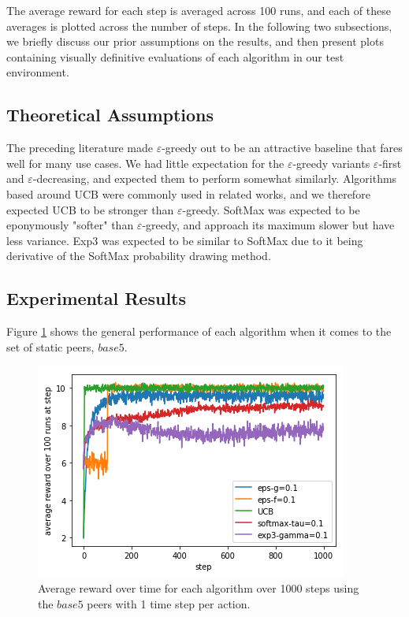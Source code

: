 \documentclass{article}
\begin{document}
The average reward for each step is averaged across 100 runs, and each of these averages is plotted across the number of steps. In the following two subsections, we briefly 
discuss our prior assumptions on the results, and then present plots containing visually definitive evaluations of each algorithm in our test environment.

\subsection{Theoretical Assumptions} 
The preceding literature made $\varepsilon$-greedy out to be an attractive baseline that fares well for many use cases. We had little expectation for the $\varepsilon$-greedy 
variants $\varepsilon$-first and $\varepsilon$-decreasing, and expected them to perform somewhat similarly. Algorithms based around UCB were commonly used in related works, 
and we therefore expected UCB to be stronger than $\varepsilon$-greedy. SoftMax was expected to be eponymously "softer" than $\varepsilon$-greedy, and approach its maximum 
slower but have less variance. Exp3 was expected to be similar to SoftMax due to it being derivative of the SoftMax probability drawing method.

\subsection{Experimental Results} 

Figure \ref{fig:base5_1ts_1000step_5algos} shows the general performance of each algorithm when it comes to the set of static peers, $base5$.
\begin{figure}[h]
    \centering
    \includegraphics[width=1\linewidth]{figs/base5_1ts_1000step_5algos.png}
    \caption{Average reward over time for each algorithm over 1000 steps using the $base5$ peers with 1 time step per action.}
    \label{fig:base5_1ts_1000step_5algos}
\end{figure}
\end{document}
